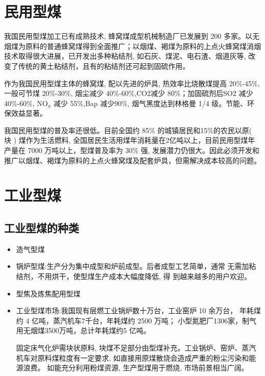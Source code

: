 \documentclass[10pt,openany]{ctexbook}
\begin{document}
\section{民用型煤}      我国民用型煤加工已有成熟技术, 蜂窝煤成型机械制造厂已发展到 200 多家。以无烟煤为原料的普通蜂窝煤得到全面推广；以烟煤、褐煤为原料的上点火蜂窝煤消烟技术取得很大进展，已开发出多种粘结剂, 如石灰、煤泥、电石渣、烟道灰等, 改变了传统的黄土粘结剂，且有的粘结剂还可起到固硫作用。\par
    作为我国民用型煤主体的蜂窝煤, 配以先进的炉具, 热效率比烧散煤提高 20\%-45\%, 一般可节煤 20\%-30\%, 烟尘减少 40\%-60\%,CO2减少 80\%；加固硫剂后SO2 减少40\%-60\%, NO$_x$ 减少 55\%,Bap 减少90\%, 烟气黑度达到林格曼 1/4 级。节能、环保效益显著。\par
  我国民用型煤的普及率还很低。目前全国约 85\% 的城镇居民和15\%的农民以原( 块 ) 煤作为生活燃料, 全国居民生活用煤年消耗量在2亿吨以上，目前民用型煤年产量在 7000 万吨以上，型煤普及率为 30\% 强, 发展潜力仍很大。因此必须开发和推广以烟煤、褐煤为原料的上点火蜂窝煤及配套炉具，但需解决成本较高的问题。
  \section{工业型煤}
 \subsection{工业型煤的种类 }
 \begin{itemize}
 \item   造气型煤
\item 锅炉型煤:生产分为集中成型和炉前成型。后者成型工艺简单，通常
无需加粘结剂，不用烘干，使型煤生产成本大幅度降低, 得
到越来越多的用户欢迎。
\item 型焦及炼焦配用型煤
\item 工业型煤市场:我国现有层燃工业锅炉数十万台，工业窑炉 10 余万台，
年耗煤约 4 亿吨，蒸汽机车7千台，年耗煤约 2500 万吨；
小型氮肥厂1306家，制气用无烟煤3500万吨，总计年耗煤约5
亿吨。    \par 固定床气化炉需块状原料, 块煤不足部分由型煤补充。工业锅炉、窑炉、蒸汽机车对原料煤粒度有一定要求, 如直接用原煤散烧会造成严重的粉尘污染和能源浪费。 如能充分利用粉煤资源, 生产型煤用于燃烧, 市场前景相当广阔。
\end{itemize}
\end{document}
